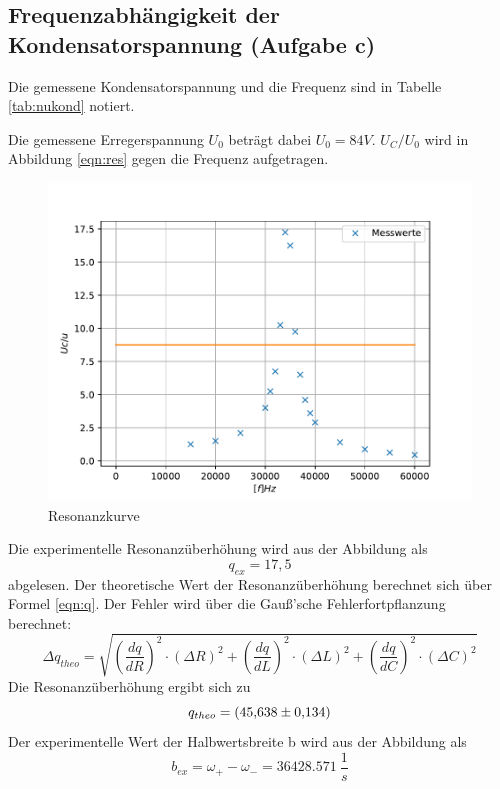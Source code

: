 \subsection{Frequenzabhängigkeit der Kondensatorspannung (Aufgabe c)}
Die gemessene Kondensatorspannung und die Frequenz sind in Tabelle \ref{tab:nukond} notiert.

Die gemessene Erregerspannung $U_{0}$ beträgt dabei $U_{0}=84V$.
$U_{C}/U_{0}$ wird in Abbildung \ref{eqn:res} gegen die Frequenz aufgetragen.
\begin{figure}[h!]
  \centering
  \includegraphics[width=\textwidth]{normkonspan.pdf}
  \caption{Resonanzkurve}
  \label{fig:res}
\end{figure}
Die experimentelle Resonanzüberhöhung wird aus der Abbildung als
\begin{equation*}
  q_{ex} = 17,5
\end{equation*}
abgelesen.
Der theoretische Wert der Resonanzüberhöhung berechnet sich über Formel \eqref{eqn:q}.
Der Fehler wird über die Gauß'sche Fehlerfortpflanzung berechnet:
\begin{equation*}
  \Delta q_{theo} = \sqrt{ \left( \frac{dq}{dR} \right)^2 \cdot (\Delta R)^2 + \left( \frac{dq}{dL} \right)^2 \cdot (\Delta L)^2 + \left( \frac{dq}{dC} \right)^2 \cdot (\Delta C)^2}
\end{equation*}
Die Resonanzüberhöhung ergibt sich zu
\begin{equation*}
  q_{theo}= \SI{45.638 \pm 0.134}.
\end{equation*}
Der experimentelle Wert der Halbwertsbreite b wird aus der Abbildung als
\begin{equation*}
  b_{ex} = \omega_{+} - \omega_{-} = \SI{36428.571}{\frac{1}{s}}
\end{equation*}
